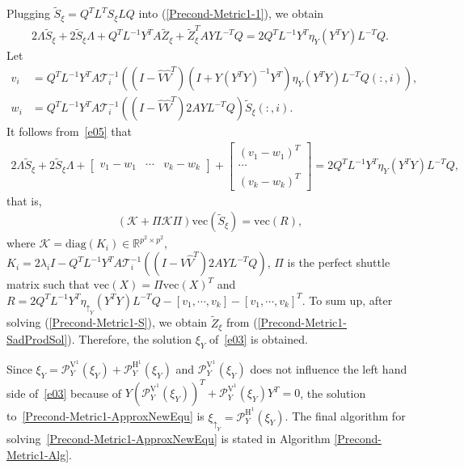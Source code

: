 \documentclass[11pt]{article}
\numberwithin{equation}{section}
\begin{document}
Plugging $\tilde{S}_\xi=Q^TL^TS_\xi LQ$ into (\ref{Precond-Metric1-1}), we obtain 
\begin{align} \label{e05}
  2\Lambda\tilde{S}_\xi+2\tilde{S}_\xi\Lambda+Q^TL^{-1}Y^TA\tilde{Z}_\xi+\tilde{Z}_\xi^TAYL^{-T}Q=2Q^TL^{-1}Y^T\eta_Y(Y^TY)L^{-T}Q.
\end{align}
Let 
\begin{align*}
  v_i&=Q^TL^{-1}Y^TA\mathcal{T}_i^{-1}\left( (I-\hat{V}\hat{V}^T)(I+Y(Y^TY)^{-1}Y^T)\eta_Y(Y^TY)L^{-T}Q(:,i)\right), \\ w_i&=Q^TL^{-1}Y^TA\mathcal{T}_i^{-1}\left( (I-\hat{V}\hat{V}^T)2AYL^{-T}Q\right)\tilde{S}_\xi(:,i).
\end{align*}
It follows from~\eqref{e05} that
\begin{align*}
  2\Lambda \tilde{S}_\xi+2\tilde{S}_\xi\Lambda + \begin{bmatrix} v_1-w_1&\cdots&v_k-w_k \end{bmatrix} + \begin{bmatrix} (v_1-w_1)^T \\ \cdots\\(v_k-w_k)^T \end{bmatrix}=2Q^TL^{-1}Y^T\eta_Y(Y^TY)L^{-T}Q,
\end{align*}
that is, 
\begin{align} \label{Precond-Metric1-S}
  (\mathcal{K}+\Pi\mathcal{K}\Pi)\mathrm{vec}(\tilde{S}_\xi)=\mathrm{vec}(R),
\end{align}
where $\mathcal{K}=\mathrm{diag}(K_i)\in\mathbb{R}^{p^2\times p^2}$, $K_i=2\lambda_iI-Q^TL^{-1}Y^TA\mathcal{T}_i^{-1}\left( (I-\hat{V}\hat{V}^T)2AYL^{-T}Q\right)$,
$\Pi$ is the perfect shuttle matrix \cite{Loan2000TheUK} such that $\mathrm{vec}(X)=\Pi\mathrm{vec}(X)^T$ and $R=2Q^TL^{-1}Y^T\eta_{\uparrow_Y}(Y^TY)L^{-T}Q-[v_1,\cdots,v_k]-[v_1,\cdots,v_k]^T$.
To sum up, after solving (\ref{Precond-Metric1-S}), we obtain $\tilde{Z}_\xi$ from (\ref{Precond-Metric1-SadProdSol}). Therefore, the solution $\xi_Y$ of~\eqref{e03} is obtained.

Since $\xi_Y = \mathcal{P}_Y^{\mathrm{V}^1}(\xi_Y) + \mathcal{P}_Y^{\mathrm{H}^1} (\xi_Y)$ and $\mathcal{P}_Y^{\mathrm{V}^1} (\xi_Y)$ does not influence the left hand side of~\eqref{e03} because of $Y(\mathcal{P}_Y^{\mathrm{V}^1}(\xi_Y))^T+\mathcal{P}_Y^{\mathrm{V}^1}(\xi_Y)Y^T=0$, the solution to~\eqref{Precond-Metric1-ApproxNewEqu} is $\xi_{\uparrow_Y} = \mathcal{P}_Y^{\mathrm{H}^1} (\xi_Y)$. The final algorithm for solving~\eqref{Precond-Metric1-ApproxNewEqu} is stated in Algorithm \ref{Precond-Metric1-Alg}.
\end{document}
